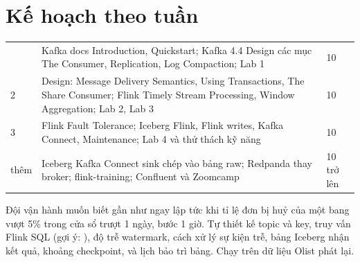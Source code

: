 \section{Kế hoạch theo tuần}
\begin{xltabular}{\textwidth}{@{}P{1.6cm} L P{1.8cm}@{}}
\toprule
{} &  &  \\
\midrule
\endhead
\bottomrule
{} & Kafka docs Introduction, Quickstart; Kafka 4.4 Design các mục The Consumer, Replication, Log Compaction; Lab 1 & 10 \\
2 & Design: Message Delivery Semantics, Using Transactions, The Share Consumer; Flink Timely Stream Processing, Window Aggregation; Lab 2, Lab 3 & 10 \\
3 & Flink Fault Tolerance; Iceberg Flink, Flink writes, Kafka Connect, Maintenance; Lab 4 và thử thách kỹ năng & 10 \\
thêm & Iceberg Kafka Connect sink chép  vào bảng raw; Redpanda thay broker; flink-training; Confluent và Zoomcamp & 10 trở lên \\
\end{xltabular}

\begin{thuthach}
Đội vận hành muốn biết gần như ngay lập tức khi tỉ lệ đơn bị huỷ của một bang vượt 5\% trong cửa sổ trượt 1 ngày, bước 1 giờ. Tự thiết kế topic và key, truy vấn Flink SQL (gợi ý: ), độ trễ watermark, cách xử lý sự kiện trễ, bảng Iceberg nhận kết quả, khoảng checkpoint, và lịch bảo trì bảng. Chạy trên dữ liệu Olist phát lại.
\end{thuthach}

